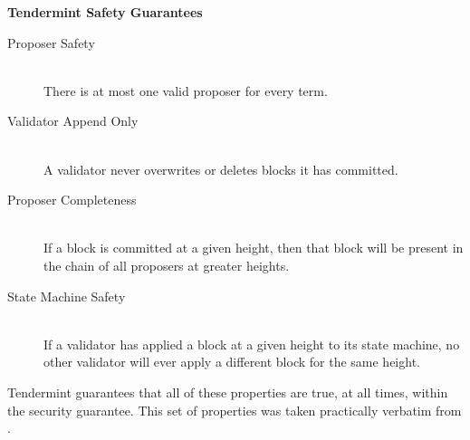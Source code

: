 \textbf{Tendermint Safety Guarantees}
\begin{description}
  \item[Proposer Safety] \hfill \\
	There is at most one valid proposer for every term.
  \item[Validator Append Only] \hfill \\
	A validator never overwrites or deletes blocks it has committed.
  \item[Proposer Completeness] \hfill \\
	If a block is committed at a given height, then that block will be present in the chain of all proposers at greater heights.
  \item[State Machine Safety] \hfill \\
	If a validator has applied a block at a given height to its state machine, no other validator will ever apply a different block for the same height.
\end{description}
\caption[Tendermint Safety Guarantees]{Tendermint guarantees that all of these properties are true, at all times, within the security guarantee. This set of properties was taken practically verbatim from \cite{raft_thesis}.}
